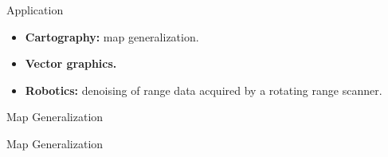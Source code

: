 \documentclass[10pt]{beamer}
\begin{document}
\begin{frame}{Application}
	\begin{itemize}
		\item \textbf{Cartography:} map generalization.
		\item \textbf{Vector graphics.}
		\item \textbf{Robotics:} denoising of range data acquired by a rotating range scanner.
	\end{itemize}
\end{frame}

\begin{frame}{Map Generalization}
	\begin{figure}[h]
	\end{figure}
\end{frame}

\begin{frame}{Map Generalization}
	\begin{figure}[h]
		\end{figure}
\end{frame}
\end{document}
